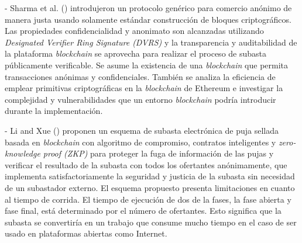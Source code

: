     - Sharma et al. (\citeyear{sharma2021}) introdujeron un protocolo genérico para comercio anónimo de 
    manera justa usando solamente estándar construcción de
    bloques criptográficos. Las propiedades confidencialidad y anonimato son alcanzadas utilizando 
    \textit{Designated Verifier Ring
    Signature (DVRS)} y la transparencia y auditabilidad de la plataforma \textit{blockchain} se aprovecha 
    para realizar el proceso de subasta
    públicamente verificable. Se asume la existencia de una \textit{blockchain} que permita transacciones 
    anónimas y confidenciales.
    También se analiza la eficiencia de emplear primitivas criptográficas en la \textit{blockchain} de 
    Ethereum e investigar la complejidad
    y vulnerabilidades que un entorno \textit{blockchain} podría introducir durante la implementación.


    - Li and Xue (\citeyear{li2021}) proponen un esquema de subasta electrónica de puja sellada basada en \textit{blockchain} con algoritmo de 
    compromiso, contratos inteligentes y \textit{zero-knowledge proof (ZKP)} para proteger la fuga de información de las pujas y verificar
    el resultado de la subasta con todos los ofertantes anónimamente, que implementa satisfactoriamente la seguridad y justicia de la 
    subasta sin necesidad de un subastador externo. El esquema propuesto presenta limitaciones en cuanto al 
    tiempo de corrida. El tiempo 
    de  ejecución de dos de la fases, la fase abierta y fase final, está determinado por el número de 
    ofertantes. Esto significa que 
    la subasta se convertiría en un trabajo que consume mucho tiempo en el caso de ser usado en 
    plataformas abiertas como Internet.


